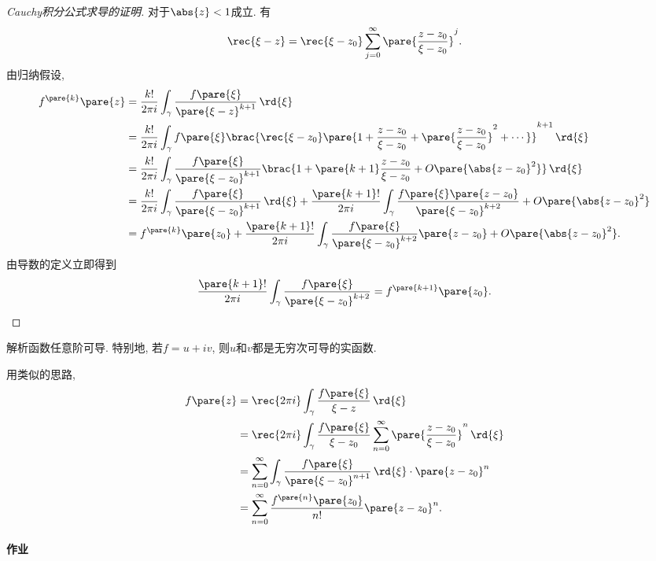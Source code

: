 \documentclass[../ComplexVariable.tex]{subfiles}
\begin{document}
\begin{proof}[Cauchy积分公式求导的证明]
    对于$\abs{z}<1$成立. 有
    \[ \rec{\xi - z} = \rec{\xi - z_0} \sum_{j=0}^\infty  \pare{\frac{z-z_0}{\xi - z_0}}^j. \]
    由归纳假设,
    \begin{align*}
        f^{\pare{k}}\pare{z} &= \frac{k!}{2\pi i} \int_\gamma \frac{f\pare{\xi}}{\pare{\xi - z}^{k+1}}\,\rd{\xi} \\
        &= \frac{k!}{2\pi i} \int_\gamma f\pare{\xi} \brac{\rec{\xi - z_0} \pare{1+\frac{z-z_0}{\xi - z_0} + \pare{\frac{z-z_0}{\xi - z_0}}^2 + \cdots}}^{k+1}\,\rd{\xi} \\
        &= \frac{k!}{2\pi i} \int_\gamma \frac{f\pare{\xi}}{\pare{\xi - z_0}^{k+1}} \brac{1+\pare{k+1}\frac{z-z_0}{\xi - z_0} + O\pare{\abs{z-z_0}^2}}\,\rd{\xi} \\
        &= \frac{k!}{2\pi i} \int_\gamma \frac{f\pare{\xi}}{\pare{\xi - z_0}^{k+1}} \,\rd{\xi} + \frac{\pare{k+1}!}{2\pi i} \int_\gamma \frac{f\pare{\xi}\pare{z-z_0}}{\pare{\xi - z_0}^{k+2}} + O\pare{\abs{z-z_0}^2} \\
        &= f^{\pare{k}}\pare{z_0} + \frac{\pare{k+1}!}{2\pi i} \int_\gamma \frac{f\pare{\xi}}{\pare{\xi - z_0}^{k+2}}\pare{z-z_0} + O\pare{\abs{z-z_0}^2}.
    \end{align*}
    由导数的定义立即得到
    \[ \frac{\pare{k+1}!}{2\pi i} \int_\gamma \frac{f\pare{\xi}}{\pare{\xi - z_0}^{k+2}} = f^{\pare{k+1}}\pare{z_0}. \qedhere \]
\end{proof}
\begin{corollary}
    \label{coll:一次可导次次可导}
    解析函数任意阶可导. 特别地, 若$f=u+iv$, 则$u$和$v$都是无穷次可导的实函数.
\end{corollary}
\begin{remark}
    用类似的思路,
    \begin{align*}
        f\pare{z} &= \rec{2\pi i} \int_\gamma \frac{f\pare{\xi}}{\xi - z}\,\rd{\xi} \\
        &= \rec{2\pi i} \int_\gamma \frac{f\pare{\xi}}{\xi - z_0} \sum_{n=0}^\infty \pare{\frac{z-z_0}{\xi - z_0}}^n\,\rd{\xi} \\
        &= \sum_{n=0}^\infty \int_\gamma \frac{f\pare{\xi}}{\pare{\xi - z_0}^{n+1}}\,\rd{\xi} \cdot\pare{z-z_0}^n \\
        &= \sum_{n=0}^\infty \frac{f^{\pare{n}}\pare{z_0}}{n!}\pare{z-z_0}^n.
    \end{align*}
\end{remark}

\paragraph{作业} %
\label{par:作业}
\end{document}
